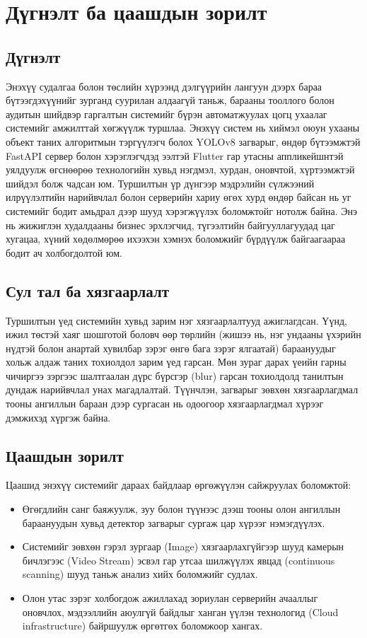 \chapter{Дүгнэлт ба цаашдын зорилт}

\section{Дүгнэлт}
Энэхүү судалгаа болон төслийн хүрээнд дэлгүүрийн лангуун дээрх бараа бүтээгдэхүүнийг зурганд суурилан алдаагүй таньж, барааны тооллого болон аудитын шийдвэр гаргалтын системийг бүрэн автоматжуулах цогц ухаалаг системийг амжилттай хөгжүүлж туршлаа. Энэхүү систем нь хиймэл оюун ухааны объект таних алгоритмын тэргүүлэгч болох YOLOv8 загварыг, өндөр бүтээмжтэй FastAPI сервер болон хэрэглэгчдэд ээлтэй Flutter гар утасны аппликейшнтэй уялдуулж өгснөөрөө технологийн хувьд нэгдмэл, хурдан, оновчтой, хүртээмжтэй шийдэл болж чадсан юм. Туршилтын үр дүнгээр мэдрэлийн сүлжээний илрүүлэлтийн нарийвчлал болон серверийн хариу өгөх хурд өндөр байсан нь уг системийг бодит амьдрал дээр шууд хэрэгжүүлэх боломжтойг нотолж байна. Энэ нь жижиглэн худалдааны бизнес эрхлэгчид, түгээлтийн байгууллагуудад цаг хугацаа, хүний хөдөлмөрөө ихээхэн хэмнэх боломжийг бүрдүүлж байгаагаараа бодит ач холбогдолтой юм.

\section{Сул тал ба хязгаарлалт}
Туршилтын үед системийн хувьд зарим нэг хязгаарлалтууд ажиглагдсан. Үүнд, ижил төстэй хаяг шошготой боловч өөр төрлийн (жишээ нь, нэг ундааны үхэрийн нүдтэй болон анартай хувилбар зэрэг өнгө бага зэрэг ялгаатай) бараануудыг хольж алдаж таних тохиолдол зарим үед гарсан. Мөн зураг дарах үеийн гарны чичиргээ зэргээс шалтгаалан дүрс бүрсгэр (blur) гарсан тохиолдолд танилтын дундаж нарийвчлал унах магадлалтай. Түүнчлэн, загварыг зөвхөн хязгаарлагдмал тооны ангиллын бараан дээр сургасан нь одоогоор хязгаарлагдмал хүрээг дэмжихэд хүргэж байна.

\section{Цаашдын зорилт}
Цаашид энэхүү системийг дараах байдлаар өргөжүүлэн сайжруулах боломжтой:
\begin{itemize}
    \item Өгөгдлийн санг баяжуулж, зуу болон түүнээс дээш тооны олон ангиллын бараануудын хувьд детектор загварыг сургаж цар хүрээг нэмэгдүүлэх.
    \item Системийг зөвхөн гэрэл зургаар (Image) хязгаарлахгүйгээр шууд камерын бичлэгээс (Video Stream) эсвэл гар утсаа шилжүүлэх явцад (continuous scanning) шууд таньж анализ хийх боломжийг судлах.
    \item Олон утас зэрэг холбогдож ажиллахад зориулан серверийн ачааллыг оновчлох, мэдээллийн аюулгүй байдлыг ханган үүлэн технологид (Cloud infrastructure) байршуулж өргөтгөх боломжоор хангах.
\end{itemize}

